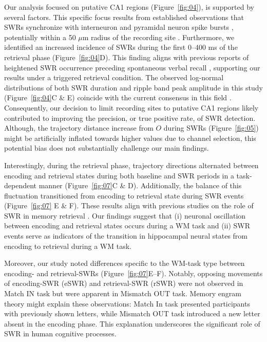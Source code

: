 \documentclass[final,3p,times,twocolumn]{elsarticle}
\begin{document}
Our analysis focused on putative CA1 regions (Figure~\ref{fig:04}), is supported by several factors. This specific focus results from established observations that SWRs synchronize with interneuron and pyramidal neuron spike bursts \cite{buzsaki_two-stage_1989} \cite{quyen_cell_2008} \cite{royer_control_2012} \cite{hajos_input-output_2013}, potentially within a 50 $\mu$m radius of the recording site \cite{schomburg_spiking_2012}. Furthermore, we identified an increased incidence of SWRs during the first 0--400 ms of the retrieval phase (Figure~\ref{fig:04}D). This finding aligns with previous reports of heightened SWR occurrence preceding spontaneous verbal recall \cite{norman_hippocampal_2019} \cite{norman_hippocampal_2021}, supporting our results under a triggered retrieval condition. The observed log-normal distributions of both SWR duration and ripple band peak amplitude in this study (Figure~\ref{fig:04}C \& E) coincide with the current consensus in this field \cite{liu_consensus_2022}. Consequently, our decision to limit recording sites to putative CA1 regions likely contributed to improving the precision, or true positive rate, of SWR detection. Although, the trajectory distance increase from $O$ during SWRs (Figure~\ref{fig:05}) might be artificially inflated towards higher values due to channel selection, this potential bias does not substantially challenge our main findings.

Interestingly, during the retrieval phase, trajectory directions alternated between encoding and retrieval states during both baseline and SWR periods in a task-dependent manner (Figure~\ref{fig:07}C \& D). Additionally, the balance of this fluctuation transitioned from encoding to retrieval state during SWR events (Figure~\ref{fig:07} E \& F). These results align with previous studies on the role of SWR in memory retrieval \cite{norman_hippocampal_2019} \cite{norman_hippocampal_2021}. Our findings suggest that (i) neuronal oscillation between encoding and retrieval states occurs during a WM task and (ii) SWR events serve as indicators of the transition in hippocampal neural states from encoding to retrieval during a WM task.

Moreover, our study noted differences specific to the WM-task type between encoding- and retrieval-SWRs (Figure~\ref{fig:07}E--F). Notably, opposing movements of encoding-SWR (eSWR) and retrieval-SWR (rSWR) were not observed in Match IN task but were apparent in Mismatch OUT task. Memory engram theory \cite{liu_optogenetic_2012} might explain these observations: Match In task presented participants with previously shown letters, while Mismatch OUT task introduced a new letter absent in the encoding phase. This explanation underscores the significant role of SWR in human cognitive processes.
\end{document}
